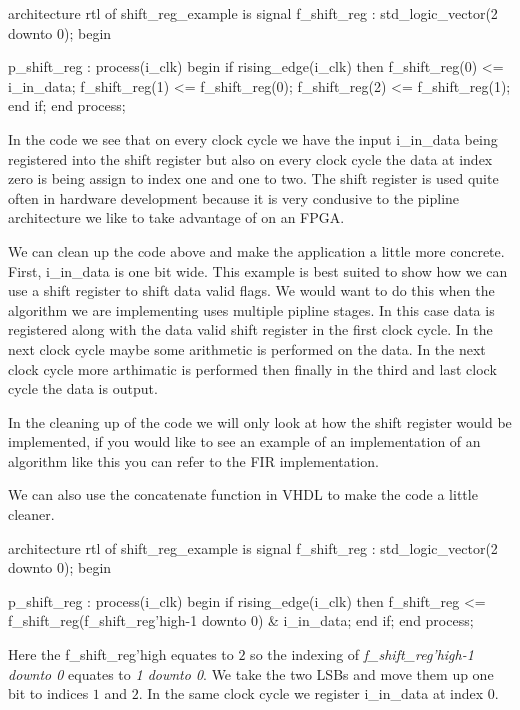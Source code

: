 \begin{VHDLlisting}[tabsize=8]
architecture rtl of shift\_reg\_example is
	signal f\_shift\_reg : std\_logic\_vector(2 downto 0);
begin

p\_shift\_reg : process(i\_clk)
begin
	if rising\_edge(i\_clk) then
		f\_shift\_reg(0) <= i\_in\_data;
		f\_shift\_reg(1) <= f\_shift\_reg(0);
		f\_shift\_reg(2) <= f\_shift\_reg(1);
	end if;
end process;
\end{VHDLlisting}

In the code we see that on every clock cycle we have the input i\_in\_data being registered into the shift register but also on every clock cycle the data at index zero is being assign to index one and one to two. The shift register is used quite often in hardware development because it is very condusive to the pipline architecture we like to take advantage of on an \ac{FPGA}.

We can clean up the code above and make the application a little more concrete. First, i\_in\_data is one bit wide. This example is best suited to show how we can use a shift register to shift data valid flags. We would want to do this when the algorithm we are implementing uses multiple pipline stages. In this case data is registered along with the data valid shift register in the first clock cycle. In the next clock cycle maybe some arithmetic is performed on the data. In the next clock cycle more arthimatic is performed then finally in the third and last clock cycle the data is output. 

In the cleaning up of the code we will only look at how the shift register would be implemented, if you would like to see an example of an implementation of an algorithm like this you can refer to the \ac{FIR} implementation.

We can also use the concatenate function in \ac{VHDL} to make the code a little cleaner.

\begin{VHDLlisting}[tabsize=8]
architecture rtl of shift\_reg\_example is
	signal f\_shift\_reg : std\_logic\_vector(2 downto 0);
begin

p\_shift\_reg : process(i\_clk)
begin
	if rising\_edge(i\_clk) then
		f\_shift\_reg <= f\_shift\_reg(f\_shift\_reg'high-1 downto 0) & i\_in\_data;
	end if;
end process;
\end{VHDLlisting}

Here the f\_shift\_reg'high equates to $2$ so the indexing of \emph{f\_shift\_reg'high-1 downto 0} equates to \emph{1 downto 0}. We take the two \ac{LSB}s and move them up one bit to indices $1$ and $2$. In the same clock cycle we register i\_in\_data at index $0$.

